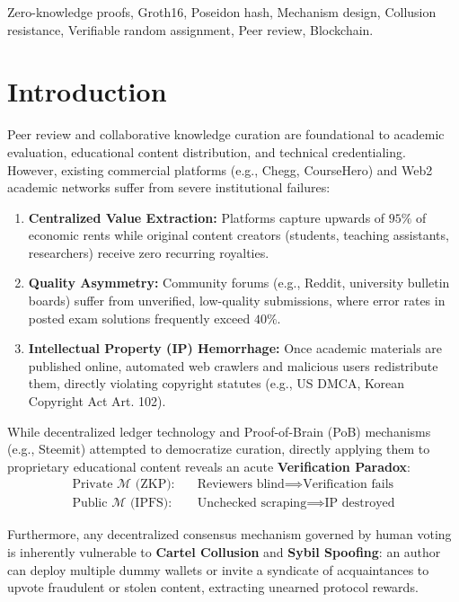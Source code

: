 \documentclass[conference,10pt]{IEEEtran}
\begin{document}
\begin{IEEEkeywords}
Zero-knowledge proofs, Groth16, Poseidon hash, Mechanism design, Collusion resistance, Verifiable random assignment, Peer review, Blockchain.
\end{IEEEkeywords}

\section{Introduction}
Peer review and collaborative knowledge curation are foundational to academic evaluation, educational content distribution, and technical credentialing. However, existing commercial platforms (e.g., Chegg, CourseHero) and Web2 academic networks suffer from severe institutional failures:
\begin{enumerate}
    \item \textbf{Centralized Value Extraction:} Platforms capture upwards of $95\%$ of economic rents while original content creators (students, teaching assistants, researchers) receive zero recurring royalties.
    \item \textbf{Quality Asymmetry:} Community forums (e.g., Reddit, university bulletin boards) suffer from unverified, low-quality submissions, where error rates in posted exam solutions frequently exceed $40\%$.
    \item \textbf{Intellectual Property (IP) Hemorrhage:} Once academic materials are published online, automated web crawlers and malicious users redistribute them, directly violating copyright statutes (e.g., US DMCA, Korean Copyright Act Art. 102).
\end{enumerate}

While decentralized ledger technology and Proof-of-Brain (PoB) mechanisms (e.g., Steemit) attempted to democratize curation, directly applying them to proprietary educational content reveals an acute \textbf{Verification Paradox}:
\begin{align}
    \text{Private } \mathcal{M} \text{ (ZKP):} &\quad \text{Reviewers blind} \implies \text{Verification fails} \nonumber \\
    \text{Public } \mathcal{M} \text{ (IPFS):} &\quad \text{Unchecked scraping} \implies \text{IP destroyed} \nonumber
\end{align}

Furthermore, any decentralized consensus mechanism governed by human voting is inherently vulnerable to \textbf{Cartel Collusion} and \textbf{Sybil Spoofing}: an author can deploy multiple dummy wallets or invite a syndicate of acquaintances to upvote fraudulent or stolen content, extracting unearned protocol rewards.
\end{document}
